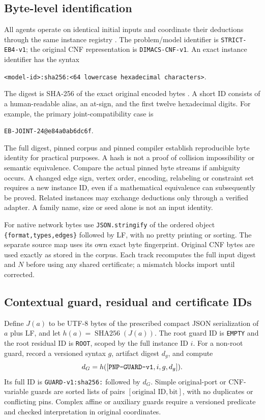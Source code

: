 \documentclass[11pt,letterpaper]{article}
\theoremstyle{definition}
\newcommand{\sha}{\operatorname{SHA256}}
\newcommand{\id}[1]{\nolinkurl{#1}}
\begin{document}
\subsection{Byte-level identification}
All agents operate on identical initial inputs and coordinate their deductions through the same instance registry \cite{registry,identifiers}. The problem/model identifier is \id{STRICT-EB4-v1}; the original CNF representation is \id{DIMACS-CNF-v1}. An exact instance identifier has the syntax
\begin{center}
\id{<model-id>:sha256:<64 lowercase hexadecimal characters>}.
\end{center}
The digest is SHA-256 of the exact original encoded bytes \cite{nistsha}. A short ID consists of a human-readable alias, an at-sign, and the first twelve hexadecimal digits. For example, the primary joint-compatibility case is
\begin{center}
\id{EB-JOINT-24@e84a0ab6dc6f}.
\end{center}
The full digest, pinned corpus and pinned compiler establish reproducible byte identity for practical purposes. A hash is not a proof of collision impossibility or semantic equivalence. Compare the actual pinned byte streams if ambiguity occurs. A changed edge sign, vertex order, encoding, relabeling or constraint set requires a new instance ID, even if a mathematical equivalence can subsequently be proved. Related instances may exchange deductions only through a verified adapter. A family name, size or seed alone is not an input identity.

For native network bytes use \id{JSON.stringify} of the ordered object \id{\{format,types,edges\}} followed by LF, with no pretty printing or sorting. The separate source map uses its own exact byte fingerprint. Original CNF bytes are used exactly as stored in the corpus. Each track recomputes the full input digest and \(N\) before using any shared certificate; a mismatch blocks import until corrected.

\subsection{Contextual guard, residual and certificate IDs}
Define \(J(a)\) to be UTF-8 bytes of the prescribed compact JSON serialization of \(a\) plus LF, and let \(h(a)=\sha(J(a))\). The root guard ID is \id{EMPTY} and the root residual ID is \id{ROOT}, scoped by the full instance ID \(i\). For a non-root guard, record a versioned syntax \(g\), artifact digest \(d_g\), and compute
\begin{equation}\label{eq:gid}
 d_G=h([\text{\texttt{PNP-GUARD-v1}},i,g,d_g]).
\end{equation}
Its full ID is \id{GUARD-v1:sha256:} followed by \(d_G\). Simple original-port or CNF-variable guards are sorted lists of pairs \([\text{original ID},\text{bit}]\), with no duplicates or conflicting pins. Complex affine or auxiliary guards require a versioned predicate and checked interpretation in original coordinates.
\end{document}
